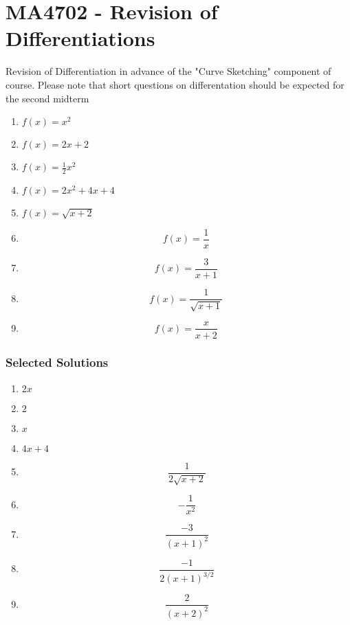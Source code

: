 

	\section*{MA4702 -  Revision of Differentiations}
	

\Large
	\noindent Revision of Differentiation in advance of the "Curve Sketching" component of course. Please note that short questions on differentation should be expected for the second midterm
	\begin{multicols}{2}
		\begin{enumerate}
			\item	\qquad	 $ f(x) = x^2 \,$ %
			\item	\qquad	 $ f(x) = 2x + 2 \,$ %
			\item	\qquad	 $ f(x) = \frac{1}{2}x^2 \,$ %
			\item	\qquad	 $ f(x) = 2x^2 + 4x + 4 \,$ %
			\item	\qquad	 $ f(x) = \sqrt{x+2} \,$ %
			\item		 \[ f(x) = \frac{1}{x} \,\] %
			\item		 \[ f(x) = \frac{3}{x+1} \,\] %
			\item		 \[ f(x) = \frac{1}{\sqrt{x+1}} \,\] %
				\item		 \[ f(x) = \frac{x}{x+2} \,\] %
				\end{enumerate}
			\end{multicols}
			

\subsubsection*{Selected Solutions}
\begin{framed}	
	\Large
	\begin{multicols}{2}
		\begin{enumerate}
			\item	\qquad	 $ 2x$			\item	\qquad	 $2$
			\item	\qquad	 $ x$
			\item	\qquad	 $ 4x+4$ \\
			\item		 \[ \frac{1}{2\sqrt{x+2}}\]
			\item		 \[ -\frac{1}{x^2}\]
			\item		 \[ \frac{-3}{(x+1)^2}\]
			\item \[\frac{-1}{2(x+1)^{3/2}}\]
			\item		\[\frac{2}{(x+2)^2}\]
		\end{enumerate}
	\end{multicols}
\end{framed}
\newpage


